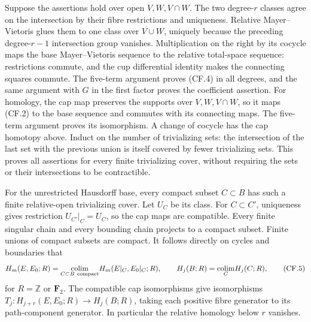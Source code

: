 \documentclass[
  11pt,
]{article}
\begin{document}
Suppose the assertions hold over open \(V,W,V\cap W\). The two
degree-\(r\) classes agree on the intersection by their fibre
restrictions and uniqueness. Relative Mayer--Vietoris glues them to one
class over \(V\cup W\), uniquely because the preceding degree-\(r-1\)
intersection group vanishes. Multiplication on the right by its cocycle
maps the base Mayer--Vietoris sequence to the relative total-space
sequence: restrictions commute, and the cup differential identity makes
the connecting squares commute. The five-term argument proves (CF.4) in
all degrees, and the same argument with \(G\) in the first factor proves
the coefficient assertion. For homology, the cap map preserves the
supports over \(V,W,V\cap W\), so it maps (CF.2) to the base sequence
and commutes with its connecting maps. The five-term argument proves its
isomorphism. A change of cocycle has the cap homotopy above. Induct on
the number of trivializing sets: the intersection of the last set with
the previous union is itself covered by fewer trivializing sets. This
proves all assertions for every finite trivializing cover, without
requiring the sets or their intersections to be contractible.

For the unrestricted Hausdorff base, every compact subset \(C\subset B\)
has such a finite relative-open trivializing cover. Let \(U_C\) be its
class. For \(C\subset C'\), uniqueness gives restriction
\(U_{C'}|_C=U_C\), so the cap maps are compatible. Every finite singular
chain and every bounding chain projects to a compact subset. Finite
unions of compact subsets are compact. It follows directly on cycles and
boundaries that \[
H_m(E,E_0;R)=\underset{C\subset B\ {\rm compact}}{\operatorname{colim}}
H_m(E|_C,E_0|_C;R),\qquad
H_j(B;R)=\underset C{\operatorname{colim}}H_j(C;R),
\tag{CF.5}
\] for \(R=\mathbb Z\) or \(\mathbf F_2\). The compatible cap
isomorphisms give isomorphisms \(T_j:H_{j+r}(E,E_0;R)\to H_j(B;R)\),
taking each positive fibre generator to its path-component generator. In
particular the relative homology below \(r\) vanishes.
\end{document}
